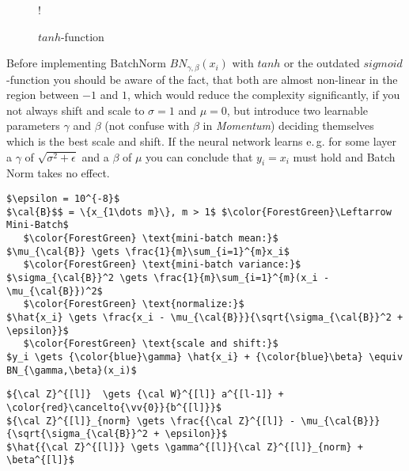 \documentclass[dvipsnames,twocolumn]{scrartcl}
\begin{document}
	\begin{figure}
		\caption{$tanh$-function}
		\resizebox {\columnwidth} {!} {}
	\end{figure}
	
	Before implementing BatchNorm $BN_{\gamma,\beta}(x_i)$ with $tanh$ or the outdated $sigmoid$-function you should be aware of the fact, that both are almost non-linear in the region between $-1$ and $1$, which would reduce the complexity significantly, if you not always shift and scale to $\sigma = 1$ and $\mu = 0$, but introduce two learnable parameters $\gamma$ and $\beta$ (not confuse with $\beta$ in \emph{Momentum}) deciding themselves which is the best scale and shift. If the neural network learns e.\,g. for some layer a $\gamma$ of  $\sqrt{\sigma^2 + \epsilon}$ and a $\beta$ of $\mu$ you can conclude that $y_i = x_i$ must hold and Batch Norm takes no effect.
	
	\begin{lstlisting}[frame=single,basicstyle=\linespread{1.5}\ttfamily,caption={\texttt{Batch-Norm} Algorithm}]
$\epsilon = 10^{-8}$
$\cal{B}$$ = \{x_{1\dots m}\}, m > 1$ $\color{ForestGreen}\Leftarrow Mini-Batch$
   $\color{ForestGreen} \text{mini-batch mean:}$
$\mu_{\cal{B}} \gets \frac{1}{m}\sum_{i=1}^{m}x_i$
   $\color{ForestGreen} \text{mini-batch variance:}$
$\sigma_{\cal{B}}^2 \gets \frac{1}{m}\sum_{i=1}^{m}(x_i - \mu_{\cal{B}})^2$
   $\color{ForestGreen} \text{normalize:}$
$\hat{x_i} \gets \frac{x_i - \mu_{\cal{B}}}{\sqrt{\sigma_{\cal{B}}^2 + \epsilon}}$
   $\color{ForestGreen} \text{scale and shift:}$
$y_i \gets {\color{blue}\gamma} \hat{x_i} + {\color{blue}\beta} \equiv BN_{\gamma,\beta}(x_i)$
	\end{lstlisting}
	
	\begin{lstlisting}[frame=single,basicstyle=\linespread{1.5}\ttfamily,caption={\texttt{Batch-Norm} Algorithm in a Neural-Net Layer}]
${\cal Z}^{[l]}  \gets {\cal W}^{[l]} a^{[l-1]} + \color{red}\cancelto{\vv{0}}{b^{[l]}}$
${\cal Z}^{[l]}_{norm} \gets \frac{{\cal Z}^{[l]} - \mu_{\cal{B}}}{\sqrt{\sigma_{\cal{B}}^2 + \epsilon}}$
$\hat{{\cal Z}^{[l]}} \gets \gamma^{[l]}{\cal Z}^{[l]}_{norm} + \beta^{[l]}$
	\end{lstlisting}
	
\end{document}
